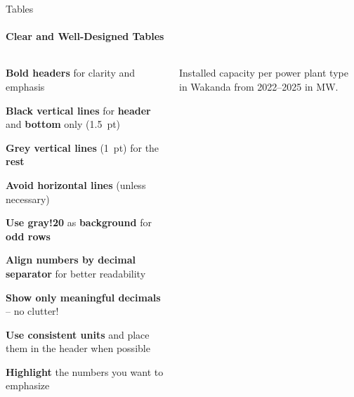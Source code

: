 \documentclass[aspectratio=169]{beamer}
\begin{document}
\begin{frame}{Tables}
    \framesubtitle{Clear and Well-Designed Tables}

    \vspace{-.7cm}
    \begin{columns}
        \begin{column}{0.49\textwidth}
            \begin{coloredblock}
                \vspace{0.2cm}
                \begin{tugitemize}
                    \item \footnotesize \textbf{Bold headers} for clarity and emphasis
                    \item \textbf{Black vertical lines} for \textbf{header} and \textbf{bottom} only (1.5~pt) 
                    \item \textbf{Grey vertical lines} (1~pt) for the \textbf{rest}
                    \item \footnotesize \textbf{Avoid horizontal lines} (unless necessary)
                    \item \footnotesize \textbf{Use gray!20} as \textbf{background} for \textbf{odd rows}
                \end{tugitemize}
            \end{coloredblock}
            \vspace{0.2cm}
            \begin{coloredblock}
                \vspace{0.2cm}
                \begin{tugitemize}
                    \item \footnotesize \textbf{Align numbers by decimal separator} for better readability
                    \item \footnotesize \textbf{Show only meaningful decimals} – no clutter!
                    \item \footnotesize \textbf{Use consistent units} and place them in the header when possible
                    \item \footnotesize \textbf{Highlight} the numbers you want to emphasize
                \end{tugitemize}
            \end{coloredblock}
        \end{column}
        \begin{column}{0.49\textwidth}
            \vspace{2cm}            
            \begin{table}[htbp]
                
                \caption{\centering Installed capacity per power plant type in Wakanda from 2022--2025 in MW.}
            \end{table}
        \end{column}
    \end{columns}


\end{frame}
\end{document}
